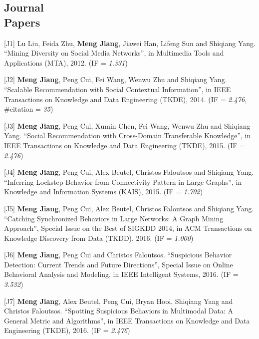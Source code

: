 \documentclass[margin, 10pt]{res}
\begin{document}
\begin{resume}

\section{Journal \\ Papers}

[J1] Lu Liu, Feida Zhu, \textbf{Meng Jiang}, Jiawei Han, Lifeng Sun and Shiqiang Yang. ``Mining Diversity on Social Media Networks'', in Multimedia Tools and Applications (MTA), 2012. (IF = \textit{1.331})

[J2] \textbf{Meng Jiang}, Peng Cui, Fei Wang, Wenwu Zhu and Shiqiang Yang. ``Scalable Recommendation with Social Contextual Information'', in IEEE Transactions on Knowledge and Data Engineering (TKDE), 2014. (IF = \textit{2.476}, \#citation = \textit{35})

[J3] \textbf{Meng Jiang}, Peng Cui, Xumin Chen, Fei Wang, Wenwu Zhu and Shiqiang Yang. ``Social Recommendation with Cross-Domain Transferable Knowledge'', in IEEE Transactions on Knowledge and Data Engineering (TKDE), 2015. (IF = \textit{2.476})

[J4] \textbf{Meng Jiang}, Peng Cui, Alex Beutel, Christos Faloutsos and Shiqiang Yang. ``Inferring Lockstep Behavior from Connectivity Pattern in Large Graphs'', in Knowledge and Information Systems (KAIS), 2015. (IF = \textit{1.702})

[J5] \textbf{Meng Jiang}, Peng Cui, Alex Beutel, Christos Faloutsos and Shiqiang Yang. ``Catching Synchronized Behaviors in Large Networks: A Graph Mining Approach'', Special Issue on the Best of SIGKDD 2014, in ACM Transactions on Knowledge Discovery from Data (TKDD), 2016. (IF = \textit{1.000})

[J6] \textbf{Meng Jiang}, Peng Cui and Christos Faloutsos. ``Suspicious Behavior Detection: Current Trends and Future Directions'', Special Issue on Online Behavioral Analysis and Modeling, in IEEE Intelligent Systems, 2016. (IF = \textit{3.532})

[J7] \textbf{Meng Jiang}, Alex Beutel, Peng Cui, Bryan Hooi, Shiqiang Yang and Christos Faloutsos. ``Spotting Suspicious Behaviors in Multimodal Data: A General Metric and Algorithms'', in IEEE Transactions on Knowledge and Data Engineering (TKDE), 2016. (IF = \textit{2.476})



\end{resume}
\end{document}
